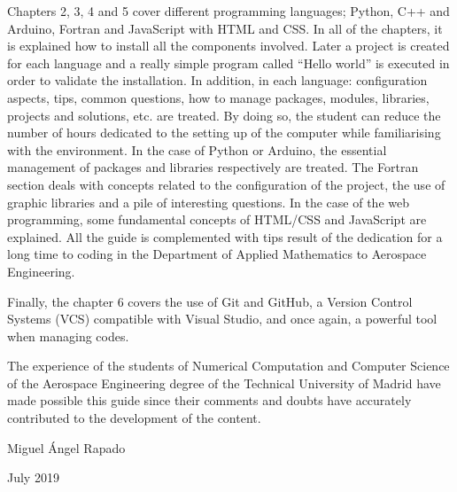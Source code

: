Chapters 2, 3, 4 and 5 cover different programming languages; Python, C++ and Arduino, Fortran and JavaScript with HTML and CSS. In all of the chapters, it is explained how to install all the components involved. Later a project is created for each language and a really simple program called ``Hello world'' is executed in order to validate the installation. In addition, in each language: configuration aspects, tips, common questions, how to manage packages, modules, libraries, projects and solutions, etc. are treated. By doing so, the student can reduce the number of hours dedicated to the setting up of the computer while familiarising with the environment. In the case of Python or Arduino, the essential management of packages and libraries respectively are treated. The Fortran section deals with concepts related to the configuration of the project, the use of graphic libraries and a pile of interesting questions. In the case of the web programming, some fundamental concepts of HTML/CSS and JavaScript are explained. All the guide is complemented with tips result of the dedication for a long time to coding in the Department of Applied Mathematics to Aerospace Engineering.

Finally, the chapter 6 covers the use of Git and GitHub, a Version Control Systems (VCS) compatible with Visual Studio, and once again, a powerful tool when managing codes. 

The experience of the students of Numerical Computation and Computer Science of the Aerospace Engineering degree of the Technical University of Madrid have made possible this guide since their comments and doubts have accurately contributed to the development of the content.

\begin{flushright}
    Miguel Ángel Rapado
    
    \vspace{-0.2cm}
    July 2019
\end{flushright}


